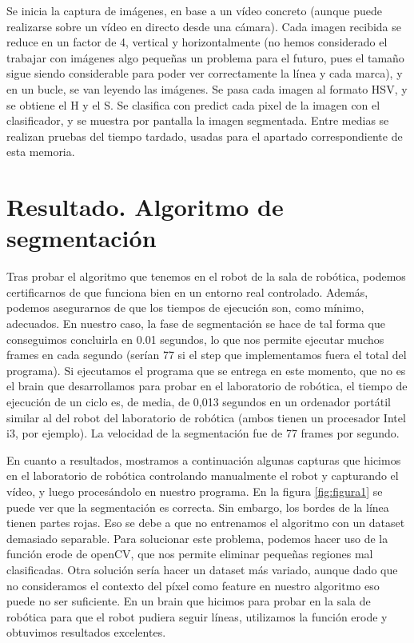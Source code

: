 \documentclass{article}
\begin{document}
	Se inicia la captura de imágenes, en base a un vídeo concreto (aunque puede realizarse sobre un vídeo en directo desde una cámara). Cada imagen recibida se reduce en un factor de 4, vertical y horizontalmente (no hemos considerado el trabajar con imágenes algo pequeñas un problema para el futuro, pues el tamaño sigue siendo considerable para poder ver correctamente la línea y cada marca), y en un bucle, se van leyendo las imágenes. Se pasa cada imagen al formato HSV, y se obtiene el H y el S. Se clasifica con predict cada pixel de la imagen con el clasificador, y se muestra por pantalla la imagen segmentada. Entre medias se realizan pruebas del tiempo tardado, usadas para el apartado correspondiente de esta memoria.


\section{Resultado. Algoritmo de segmentación}
	Tras probar el algoritmo que tenemos en el robot de la sala de robótica, podemos certificarnos de que funciona bien en un entorno real controlado. Además, podemos asegurarnos de que los tiempos de ejecución son, como mínimo, adecuados. En nuestro caso, la fase de segmentación se hace de tal forma que conseguimos concluirla en 0.01 segundos, lo que nos permite ejecutar muchos frames en cada segundo (serían 77 si el step que implementamos fuera el total del programa). Si ejecutamos el programa que se entrega en este momento, que no es el brain que desarrollamos para probar en el laboratorio de robótica, el tiempo de ejecución de un ciclo es, de media, de 0,013 segundos en un ordenador portátil similar al del robot del laboratorio de robótica (ambos tienen un procesador Intel i3, por ejemplo). La velocidad de la segmentación fue de 77 frames por segundo.

	En cuanto a resultados, mostramos a continuación algunas capturas que hicimos en el laboratorio de robótica controlando manualmente el robot y capturando el vídeo, y luego procesándolo en nuestro programa. En la figura \ref{fig:figura1} se puede ver que la segmentación es correcta. Sin embargo, los bordes de la línea tienen partes rojas. Eso se debe a que no entrenamos el algoritmo con un dataset demasiado separable. Para solucionar este problema, podemos hacer uso de la función erode de openCV, que nos permite eliminar pequeñas regiones mal clasificadas. Otra solución sería hacer un dataset más variado, aunque dado que no consideramos el contexto del píxel como feature en nuestro algoritmo eso puede no ser suficiente. En un brain que hicimos para probar en la sala de robótica para que el robot pudiera seguir líneas, utilizamos la función erode y obtuvimos resultados excelentes.
\end{document}
